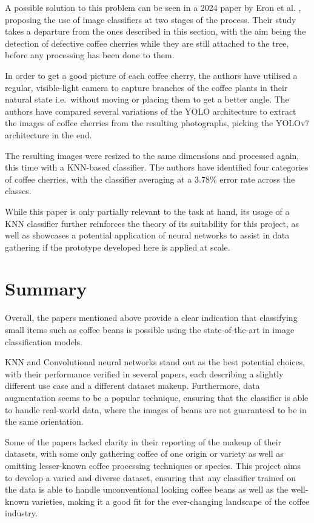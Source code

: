 A possible
solution to this problem can be seen in a 2024 paper by Eron et al.
\cite{eronCoffeeCherryOnTrees}, proposing the use of image classifiers at two stages
of the process.
Their study takes a departure from the ones described in this
section, with the aim being the detection of defective coffee cherries while they
are still attached to the tree, before any processing has been done to them.

In order to get a good picture of each coffee cherry, the authors have utilised a
regular, visible-light camera to capture branches of the coffee plants in their
natural state i.e.\ without moving or placing them to get a better angle.
The
authors have compared several variations of the YOLO architecture to extract the
images of coffee cherries from the resulting photographs, picking the YOLOv7 architecture
in the end.

The resulting images were resized to the same dimensions and processed again,
this time with a KNN-based classifier.
The authors have identified four categories
of coffee cherries, with the classifier averaging at a 3.78\% error rate across the
classes.

While this paper is only partially relevant to the task at hand, its usage of a
KNN classifier further reinforces the theory of its suitability for this project,
as well as showcases a potential application of neural networks to assist in data
gathering if the prototype developed here is applied at scale.

\section{Summary}
\label{sec:lit-review-summary}
Overall, the papers mentioned above provide a
clear indication that classifying small items such as coffee beans is possible
using the state-of-the-art in image classification models.

KNN and Convolutional neural networks stand out as the best potential choices, with
their performance verified in several papers, each describing a slightly
different use case and a different dataset makeup.
Furthermore, data
augmentation seems to be a popular technique, ensuring that the classifier is able
to handle real-world data, where the images of beans are not guaranteed to be in
the same orientation.

Some of the papers lacked clarity in their reporting of the makeup of their
datasets, with some only gathering coffee of one origin or variety as well as omitting
lesser-known coffee processing techniques or species.
This project aims to
develop a varied and diverse dataset, ensuring that any classifier trained on the
data is able to handle unconventional looking coffee beans as well as the well-known
varieties, making it a good fit for the ever-changing landscape of the coffee
industry.
